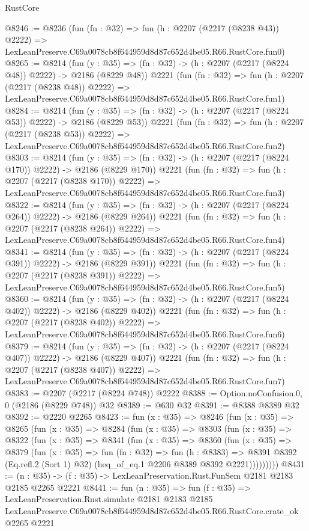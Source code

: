 \begin{lexlean}{RustCore}
\begin{coremodule}
@8246 := @8236
    (fun (fn : @32) =>
    fun (h : @2207 (@2217 (@8238 @43)) @2222) =>
    LexLeanPreserve.C69a0078cb8f644959d8d87c652d4be05.R66.RustCore.fun0)
@8265 := @8214
    (fun (y : @35) => (fn : @32) -> (h : @2207 (@2217 (@8224 @48)) @2222) -> @2186 (@8229 @48))
    @2221
    (fun (fn : @32) =>
    fun (h : @2207 (@2217 (@8238 @48)) @2222) =>
    LexLeanPreserve.C69a0078cb8f644959d8d87c652d4be05.R66.RustCore.fun1)
@8284 := @8214
    (fun (y : @35) => (fn : @32) -> (h : @2207 (@2217 (@8224 @53)) @2222) -> @2186 (@8229 @53))
    @2221
    (fun (fn : @32) =>
    fun (h : @2207 (@2217 (@8238 @53)) @2222) =>
    LexLeanPreserve.C69a0078cb8f644959d8d87c652d4be05.R66.RustCore.fun2)
@8303 := @8214
    (fun (y : @35) => (fn : @32) -> (h : @2207 (@2217 (@8224 @170)) @2222) -> @2186 (@8229 @170))
    @2221
    (fun (fn : @32) =>
    fun (h : @2207 (@2217 (@8238 @170)) @2222) =>
    LexLeanPreserve.C69a0078cb8f644959d8d87c652d4be05.R66.RustCore.fun3)
@8322 := @8214
    (fun (y : @35) => (fn : @32) -> (h : @2207 (@2217 (@8224 @264)) @2222) -> @2186 (@8229 @264))
    @2221
    (fun (fn : @32) =>
    fun (h : @2207 (@2217 (@8238 @264)) @2222) =>
    LexLeanPreserve.C69a0078cb8f644959d8d87c652d4be05.R66.RustCore.fun4)
@8341 := @8214
    (fun (y : @35) => (fn : @32) -> (h : @2207 (@2217 (@8224 @391)) @2222) -> @2186 (@8229 @391))
    @2221
    (fun (fn : @32) =>
    fun (h : @2207 (@2217 (@8238 @391)) @2222) =>
    LexLeanPreserve.C69a0078cb8f644959d8d87c652d4be05.R66.RustCore.fun5)
@8360 := @8214
    (fun (y : @35) => (fn : @32) -> (h : @2207 (@2217 (@8224 @402)) @2222) -> @2186 (@8229 @402))
    @2221
    (fun (fn : @32) =>
    fun (h : @2207 (@2217 (@8238 @402)) @2222) =>
    LexLeanPreserve.C69a0078cb8f644959d8d87c652d4be05.R66.RustCore.fun6)
@8379 := @8214
    (fun (y : @35) => (fn : @32) -> (h : @2207 (@2217 (@8224 @407)) @2222) -> @2186 (@8229 @407))
    @2221
    (fun (fn : @32) =>
    fun (h : @2207 (@2217 (@8238 @407)) @2222) =>
    LexLeanPreserve.C69a0078cb8f644959d8d87c652d4be05.R66.RustCore.fun7)
@8383 := @2207 (@2217 (@8224 @748)) @2222
@8388 := Option.noConfusion.{0, 0} (@2186 (@8229 @748)) @32
@8389 := @630 @32
@8391 := @8388 @8389 @32
@8392 := @2220 @2265
@8423 := fun (x : @35) =>
  @8246
    (fun (x : @35) =>
    @8265
      (fun (x : @35) =>
      @8284
        (fun (x : @35) =>
        @8303
          (fun (x : @35) =>
          @8322
            (fun (x : @35) =>
            @8341
              (fun (x : @35) =>
              @8360
                (fun (x : @35) =>
                @8379
                  (fun (x : @35) =>
                  fun (fn : @32) =>
                  fun (h : @8383) =>
                  @8391
                    @8392
                    (Eq.refl.{2} (Sort 1) @32)
                    (heq_of_eq.{1} @2206 @8389 @8392 @2221)))))))))
@8431 := (n : @35) -> (f : @35) -> LexLeanPreservation.Rust.FunSem @2181 @2183 @2185 @2265 @2221
@8441 := fun (n : @35) =>
  fun (f : @35) =>
  LexLeanPreservation.Rust.simulate
    @2181
    @2183
    @2185
    LexLeanPreserve.C69a0078cb8f644959d8d87c652d4be05.R66.RustCore.crate_ok
    @2265
    @2221
\end{coremodule}
\end{lexlean}
